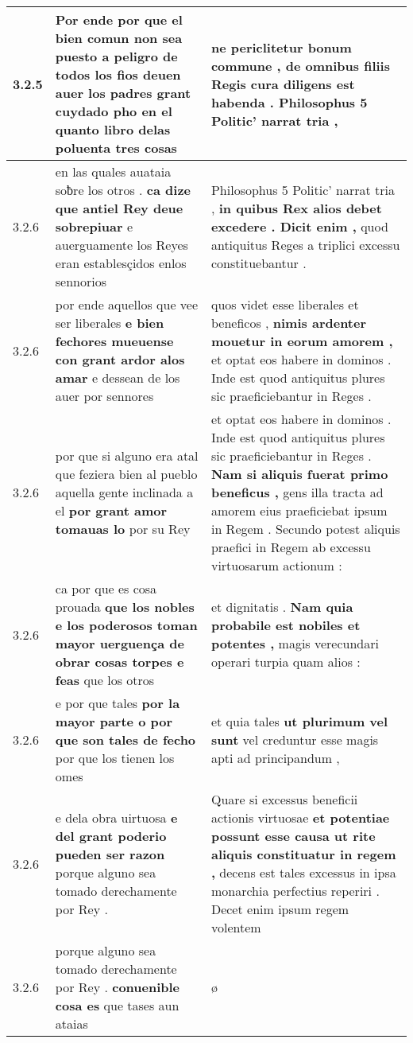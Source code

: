 \begin{tabular}{|p{1cm}|p{6.5cm}|p{6.5cm}|}
3.2.5 & Por ende por que el bien comun non sea puesto a peligro de todos los fios \textbf{ deuen auer los padres grant cuydado } pho en el quanto libro delas poluenta tres cosas & ne periclitetur bonum commune , \textbf{ de omnibus filiis Regis cura diligens est habenda . } Philosophus 5 Politic’ narrat tria , \\\hline
3.2.6 & en las quales auataia soƀre los otros . \textbf{ ca dize que antiel Rey deue sobrepiuar } e auerguamente los Reyes eran establesçidos enlos sennorios & Philosophus 5 Politic’ narrat tria , \textbf{ in quibus Rex alios debet excedere . Dicit enim , } quod antiquitus Reges a triplici excessu constituebantur . \\\hline
3.2.6 & por ende aquellos que vee ser liberales \textbf{ e bien fechores mueuense con grant ardor alos amar } e dessean de los auer por sennores & quos videt esse liberales et beneficos , \textbf{ nimis ardenter mouetur in eorum amorem , } et optat eos habere in dominos . Inde est quod antiquitus plures sic praeficiebantur in Reges . \\\hline
3.2.6 & por que si alguno era atal que feziera bien al pueblo aquella gente inclinada a el \textbf{ por grant amor tomauas lo } por su Rey & et optat eos habere in dominos . Inde est quod antiquitus plures sic praeficiebantur in Reges . \textbf{ Nam si aliquis fuerat primo beneficus , } gens illa tracta ad amorem eius praeficiebat ipsum in Regem . Secundo potest aliquis praefici in Regem ab excessu virtuosarum actionum : \\\hline
3.2.6 & ca por que es cosa prouada \textbf{ que los nobles e los poderosos toman mayor uerguença de obrar cosas torpes e feas } que los otros & et dignitatis . \textbf{ Nam quia probabile est nobiles et potentes , } magis verecundari operari turpia quam alios : \\\hline
3.2.6 & e por que tales \textbf{ por la mayor parte o por que son tales de fecho } por que los tienen los omes & et quia tales \textbf{ ut plurimum vel sunt } vel creduntur esse magis apti ad principandum , \\\hline
3.2.6 & e dela obra uirtuosa \textbf{ e del grant poderio pueden ser razon } porque alguno sea tomado derechamente por Rey . & Quare si excessus beneficii actionis virtuosae \textbf{ et potentiae possunt esse causa ut rite aliquis constituatur in regem , } decens est tales excessus in ipsa monarchia perfectius reperiri . Decet enim ipsum regem volentem \\\hline
3.2.6 & porque alguno sea tomado derechamente por Rey . \textbf{ conuenible cosa es } que tases aun ataias & ø \\\hline

\end{tabular}
